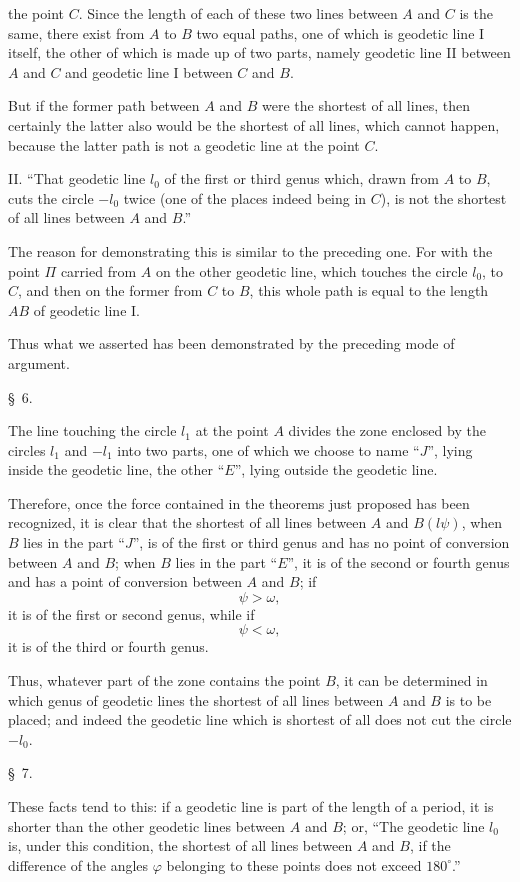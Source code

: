 \begingroup\small
the point $C$. Since the length of each of these two lines between $A$ and $C$ is the same, there exist from $A$ to $B$ two equal paths, one of which is geodetic line I itself, the other of which is made up of two parts, namely geodetic line II between $A$ and $C$ and geodetic line I between $C$ and $B$.

But if the former path between $A$ and $B$ were the shortest of all lines, then certainly the latter also would be the shortest of all lines, which cannot happen, because the latter path is not a geodetic line at the point $C$.

II. ``That geodetic line $l_0$ of the first or third genus which, drawn from $A$ to $B$, cuts the circle $-l_0$ twice (one of the places indeed being in $C$), is not the shortest of all lines between $A$ and $B$.''

The reason for demonstrating this is similar to the preceding one.
For with the point $\Pi$ carried from $A$ on the other geodetic line, which touches the circle $l_0$, to $C$, and then on the former from $C$ to $B$, this whole path is equal to the length $AB$ of geodetic line I.

Thus what we asserted has been demonstrated by the preceding mode of argument.

\begin{center}\S\ 6.\end{center}

The line touching the circle $l_1$ at the point $A$ divides the zone enclosed by the circles $l_1$ and $-l_1$ into two parts, one of which we choose to name ``$J$'', lying inside the geodetic line, the other ``$E$'', lying outside the geodetic line.

Therefore, once the force contained in the theorems just proposed has been recognized, it is clear that the shortest of all lines between $A$ and $B(l\psi)$, when $B$ lies in the part ``$J$'', is of the first or third genus and has no point of conversion between $A$ and $B$; when $B$ lies in the part ``$E$'', it is of the second or fourth genus and has a point of conversion between $A$ and $B$; if
\[
 \psi>\omega,
\]
it is of the first or second genus, while if
\[
 \psi<\omega,
\]
it is of the third or fourth genus.

Thus, whatever part of the zone contains the point $B$, it can be determined in which genus of geodetic lines the shortest of all lines between $A$ and $B$ is to be placed; and indeed the geodetic line which is shortest of all does not cut the circle $-l_0$.

\begin{center}\S\ 7.\end{center}

These facts tend to this: if a geodetic line is part of the length of a period, it is shorter than the other geodetic lines between $A$ and $B$; or,
``The geodetic line $l_0$ is, under this condition, the shortest of all lines between $A$ and $B$, if the difference of the angles $\varphi$ belonging to these points does not exceed $180^\circ$.''
\endgroup
